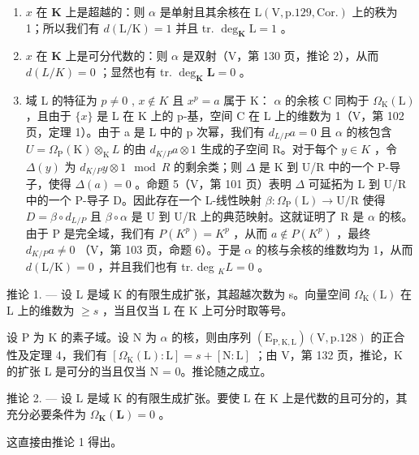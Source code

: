 \begin{enumerate}
\def\labelenumi{\alph{enumi})}
\item
  \(x\) 在 \(\mathbf{K}\) 上是超越的：则 \(\alpha\) 是单射且其余核在 \(\mathrm{L}(\mathrm{V},\mathrm{p}.129,\mathrm{Cor.})\) 上的秩为 1；所以我们有 \(d(\mathrm{L} / \mathrm{K}) = 1\) 并且 tr. \(\deg_{\mathbf{K}}\mathrm{L} = 1\) 。
\item
  \(x\) 在 \(\mathbf{K}\) 上是可分代数的：则 \(\alpha\) 是双射（V，第 130 页，推论 2），从而 \(d(L / K) = 0\) ；显然也有 tr. \(\deg_{\mathbf{K}}\mathbf{L} = 0\) 。
\item
  域 L 的特征为 \(p \neq 0\) , \(x \notin K\) 且 \(x^{p} = a\) 属于 K： \(\alpha\) 的余核 C 同构于 \(\Omega_{\mathrm{K}}(\mathrm{L})\) ，且由于 \(\{x\}\) 是 L 在 K 上的 p-基，空间 C 在 L 上的维数为 1（V，第 102 页，定理 1）。由于 a 是 L 中的 p 次幂，我们有 \(d_{L/P}a = 0\) 且 \(\alpha\) 的核包含 \(U = \Omega_{\mathrm{P}}(\mathrm{K}) \otimes_{\mathrm{K}} L\) 的由 \(d_{K/P}a \otimes 1\) 生成的子空间 R。对于每个 \(y \in K\) ，令 \(\Delta(y)\) 为 \(d_{K/P}y \otimes 1 \mod R\) 的剩余类；则 \(\Delta\) 是 K 到 U/R 中的一个 P-导子，使得 \(\Delta(a) = 0\) 。命题 5（V，第 101 页）表明 \(\Delta\) 可延拓为 L 到 U/R 中的一个 P-导子 D。因此存在一个 L-线性映射 \(\beta : \Omega_{\mathrm{P}}(\mathrm{L}) \to \mathrm{U}/\mathrm{R}\) 使得 \(D = \beta \circ d_{L/P}\) 且 \(\beta \circ \alpha\) 是 U 到 U/R 上的典范映射。这就证明了 R 是 \(\alpha\) 的核。由于 P 是完全域，我们有 \(P(K^{p}) = K^{p}\) ，从而 \(a \notin P(K^{p})\) ，最终 \(d_{K/P}a \neq 0\) （V，第 103 页，命题 6）。于是 \(\alpha\) 的核与余核的维数均为 1，从而 \(d(\mathrm{L}/\mathrm{K}) = 0\) ，并且我们也有 tr. deg \(_{K}L = 0\) 。
\end{enumerate}

推论 1. --- 设 L 是域 K 的有限生成扩张，其超越次数为 s。向量空间 \(\Omega_{\mathrm{K}}(\mathrm{L})\) 在 L 上的维数为 \(\geqslant s\) ，当且仅当 L 在 K 上可分时取等号。

设 P 为 K 的素子域。设 N 为 \(\alpha\) 的核，则由序列 \((\mathrm{E}_{\mathrm{P},\mathrm{K},\mathrm{L}})(\mathrm{V},\mathrm{p}.128)\) 的正合性及定理 4，我们有 \([\Omega_{\mathrm{K}}(\mathrm{L}):\mathrm{L}] = s + [\mathrm{N}:\mathrm{L}]\) ；由 V，第 132 页，推论，K 的扩张 L 是可分的当且仅当 N = 0。推论随之成立。

推论 2. --- 设 L 是域 K 的有限生成扩张。要使 L 在 K 上是代数的且可分的，其充分必要条件为 \(\Omega_{\mathbf{K}}(\mathbf{L}) = 0\) 。

这直接由推论 1 得出。

